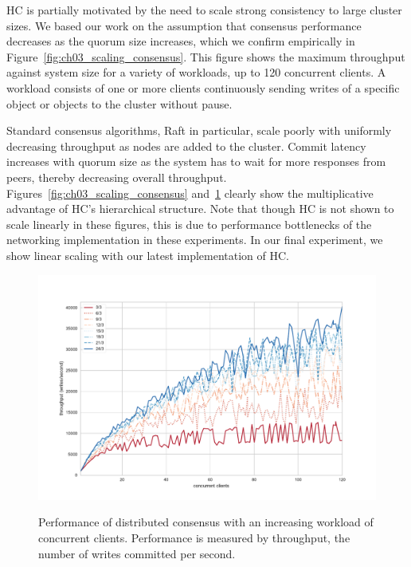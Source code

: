 HC is partially motivated by the need to scale strong consistency to large cluster sizes.
We based our work on the assumption that consensus performance decreases as the quorum size increases, which we confirm empirically in Figure~\ref{fig:ch03_scaling_consensus}.
This figure shows the maximum throughput against system size for a variety of workloads, up to 120 concurrent clients.
A workload consists of one or more clients continuously sending writes of a specific object or objects to the cluster without pause.

Standard consensus algorithms, Raft in particular, scale poorly with uniformly decreasing throughput as nodes are added to the cluster.
Commit latency increases with quorum size as the system has to wait for more responses from peers, thereby decreasing overall throughput.
Figures~\ref{fig:ch03_scaling_consensus} and~\ref{fig:ch03_hc_throughput_workload} clearly show the multiplicative advantage of HC's hierarchical structure.
Note that though HC is not shown to scale linearly in these figures, this is due to performance bottlenecks of the networking implementation in these experiments.
In our final experiment, we show linear scaling with our latest implementation of HC.

\begin{figure}
    \begin{center}
        \includegraphics[width=5in]{figures/ch03_hc_throughput_workload.pdf}
    \end{center}
    \renewcommand{\baselinestretch}{1}
    \small\normalsize

    \begin{quote}
        \caption[HC Throughput vs. Workload in the Wide Area]{Performance of distributed consensus with an increasing workload of concurrent clients. Performance is measured by throughput, the number of writes committed per second.}
        \label{fig:ch03_hc_throughput_workload}
    \end{quote}
\end{figure}
\renewcommand{\baselinestretch}{2}
\small\normalsize

